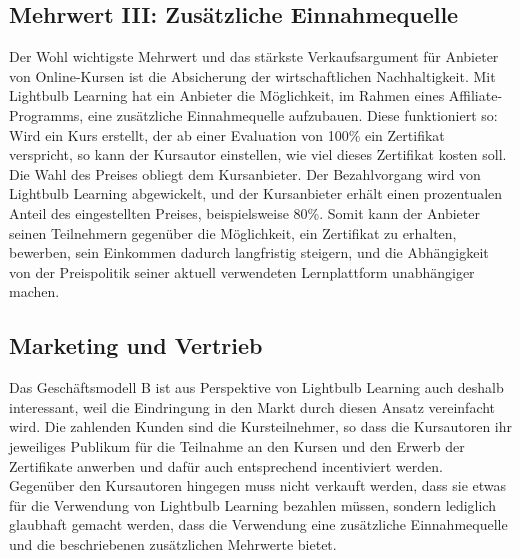 \subsection{Mehrwert III: Zusätzliche Einnahmequelle}
Der Wohl wichtigste Mehrwert und das stärkste Verkaufsargument für Anbieter von Online-Kursen ist die Absicherung der wirtschaftlichen Nachhaltigkeit. Mit Lightbulb Learning hat ein Anbieter die Möglichkeit, im Rahmen eines Affiliate-Programms, eine zusätzliche Einnahmequelle aufzubauen. Diese funktioniert so: Wird ein Kurs erstellt, der ab einer Evaluation von 100\% ein Zertifikat verspricht, so kann der Kursautor einstellen, wie viel dieses Zertifikat kosten soll. Die Wahl des Preises obliegt dem Kursanbieter. Der Bezahlvorgang wird von Lightbulb Learning abgewickelt, und der Kursanbieter erhält einen prozentualen Anteil des eingestellten Preises, beispielsweise 80\%. Somit kann der Anbieter seinen Teilnehmern gegenüber die Möglichkeit, ein Zertifikat zu erhalten, bewerben, sein Einkommen dadurch langfristig steigern, und die Abhängigkeit von der Preispolitik seiner aktuell verwendeten Lernplattform unabhängiger machen.

\subsection{Marketing und Vertrieb}
Das Geschäftsmodell B ist aus Perspektive von Lightbulb Learning auch deshalb interessant, weil die Eindringung in den Markt durch diesen Ansatz vereinfacht wird. Die zahlenden Kunden sind die Kursteilnehmer, so dass die Kursautoren ihr jeweiliges Publikum für die Teilnahme an den Kursen und den Erwerb der Zertifikate anwerben und dafür auch entsprechend incentiviert werden. Gegenüber den Kursautoren hingegen muss nicht verkauft werden, dass sie etwas für die Verwendung von Lightbulb Learning bezahlen müssen, sondern lediglich glaubhaft gemacht werden, dass die Verwendung eine zusätzliche Einnahmequelle und die beschriebenen zusätzlichen Mehrwerte bietet.